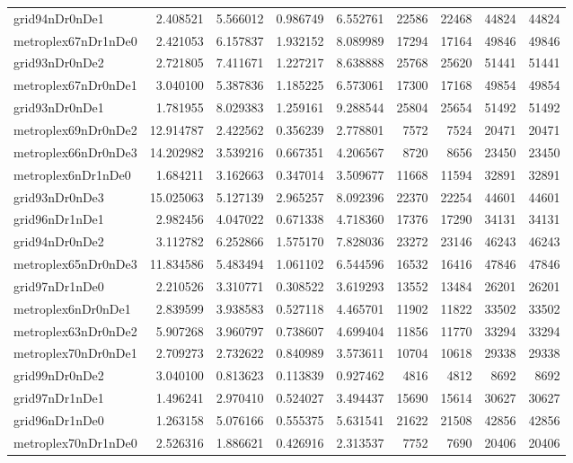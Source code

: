 \begin{longtable}{|l|r|r|r|r|r|r|r|r|}
grid94nDr0nDe1 & 2.408521 & 5.566012 & 0.986749 & 6.552761 & 22586 & 22468 & 44824 & 44824 \\
metroplex67nDr1nDe0 & 2.421053 & 6.157837 & 1.932152 & 8.089989 & 17294 & 17164 & 49846 & 49846 \\
grid93nDr0nDe2 & 2.721805 & 7.411671 & 1.227217 & 8.638888 & 25768 & 25620 & 51441 & 51441 \\
metroplex67nDr0nDe1 & 3.040100 & 5.387836 & 1.185225 & 6.573061 & 17300 & 17168 & 49854 & 49854 \\
grid93nDr0nDe1 & 1.781955 & 8.029383 & 1.259161 & 9.288544 & 25804 & 25654 & 51492 & 51492 \\
metroplex69nDr0nDe2 & 12.914787 & 2.422562 & 0.356239 & 2.778801 & 7572 & 7524 & 20471 & 20471 \\
metroplex66nDr0nDe3 & 14.202982 & 3.539216 & 0.667351 & 4.206567 & 8720 & 8656 & 23450 & 23450 \\
metroplex6nDr1nDe0 & 1.684211 & 3.162663 & 0.347014 & 3.509677 & 11668 & 11594 & 32891 & 32891 \\
grid93nDr0nDe3 & 15.025063 & 5.127139 & 2.965257 & 8.092396 & 22370 & 22254 & 44601 & 44601 \\
grid96nDr1nDe1 & 2.982456 & 4.047022 & 0.671338 & 4.718360 & 17376 & 17290 & 34131 & 34131 \\
grid94nDr0nDe2 & 3.112782 & 6.252866 & 1.575170 & 7.828036 & 23272 & 23146 & 46243 & 46243 \\
metroplex65nDr0nDe3 & 11.834586 & 5.483494 & 1.061102 & 6.544596 & 16532 & 16416 & 47846 & 47846 \\
grid97nDr1nDe0 & 2.210526 & 3.310771 & 0.308522 & 3.619293 & 13552 & 13484 & 26201 & 26201 \\
metroplex6nDr0nDe1 & 2.839599 & 3.938583 & 0.527118 & 4.465701 & 11902 & 11822 & 33502 & 33502 \\
metroplex63nDr0nDe2 & 5.907268 & 3.960797 & 0.738607 & 4.699404 & 11856 & 11770 & 33294 & 33294 \\
metroplex70nDr0nDe1 & 2.709273 & 2.732622 & 0.840989 & 3.573611 & 10704 & 10618 & 29338 & 29338 \\
grid99nDr0nDe2 & 3.040100 & 0.813623 & 0.113839 & 0.927462 & 4816 & 4812 & 8692 & 8692 \\
grid97nDr1nDe1 & 1.496241 & 2.970410 & 0.524027 & 3.494437 & 15690 & 15614 & 30627 & 30627 \\
grid96nDr1nDe0 & 1.263158 & 5.076166 & 0.555375 & 5.631541 & 21622 & 21508 & 42856 & 42856 \\
metroplex70nDr1nDe0 & 2.526316 & 1.886621 & 0.426916 & 2.313537 & 7752 & 7690 & 20406 & 20406 \\

\end{longtable}
